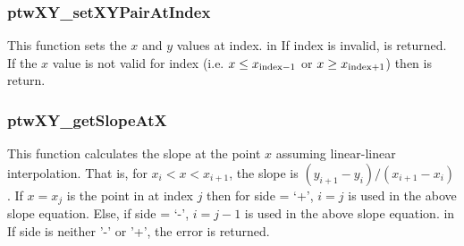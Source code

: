 \subsubsection{ptwXY\_setXYPairAtIndex}
This function sets the $x$ and $y$ values at index.
     in \noindent
If index is invalid,  is returned. If the $x$ value is not valid for index (i.e. $x \le x_{\rm index-1}$ 
or $x \ge x_{\rm index+1}$) then  is return.

\subsubsection{ptwXY\_getSlopeAtX}
This function calculates the slope at the point $x$ assuming linear-linear interpolation. That is, for $x_i < x < x_{i+1}$,
the slope is $( y_{i+1} - y_i ) / ( x_{i+1} - x_i )$. If $x = x_j$ is the point in  at
index $j$ then for side = `+', $i = j$ is used in the above slope equation. Else, if side = `-', $i = j-1$ is used in the above slope equation.
     in \noindent
If side is neither '-' or '+', the error  is returned.


